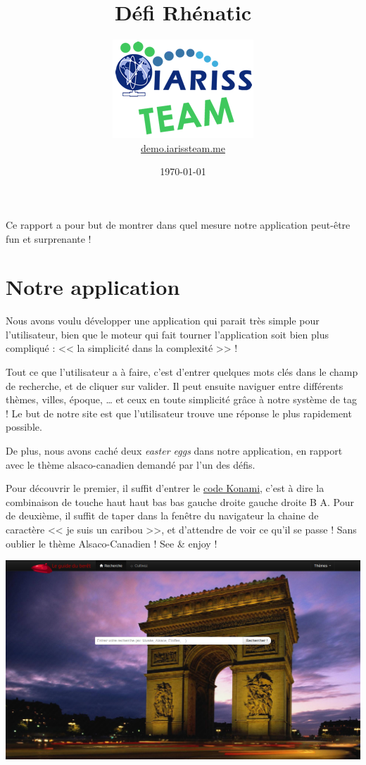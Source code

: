 \documentclass[12pt, a4paper]{article}
\title{Défi Rhénatic}
\newcommand{\espace}{\vspace{.8cm}}
\begin{document}
\author{\includegraphics{../_img/iariss_team.png} \\ {\sffamily \href{http://demo.iarissteam.me}{demo.iarissteam.me}}}
\date{\today}

\maketitle{}

{\sffamily Ce rapport a pour but de montrer dans quel mesure notre application peut-être fun et surprenante !} 

\espace{}
\section*{Notre application}
Nous avons voulu développer une application qui parait très simple pour l'utilisateur, bien que le moteur qui fait tourner l'application soit bien plus compliqué : << la simplicité dans la complexité >> !

Tout ce que l'utilisateur a à faire, c'est d'entrer quelques mots clés dans le champ de recherche, et de cliquer sur valider. Il peut ensuite naviguer entre différents thèmes, villes, époque, \ldots{} et ceux en toute simplicité grâce à notre système de tag ! Le but de notre site est que l'utilisateur trouve une réponse le plus rapidement possible.

\espace
De plus, nous avons caché deux \emph{easter eggs} dans notre application, en rapport avec le thème alsaco-canadien demandé par l'un des défis.

Pour découvrir le premier, il suffit d'entrer le \href{http://fr.wikipedia.org/wiki/Code_Konami}{code Konami}, c'est à dire la combinaison de touche haut haut bas bas gauche droite gauche droite B A.
Pour de deuxième, il suffit de taper dans la fenêtre du navigateur la chaine de caractère << je suis un caribou >>, et d'attendre de voir ce qu'il se passe !
Sans oublier le thème Alsaco-Canadien !
See \& enjoy !

\begin{center}
\includegraphics[width=.9\textwidth, keepaspectratio=true]{accueil.png}
\end{center}
\espace{}
\end{document}
